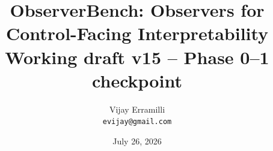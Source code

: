 \documentclass[10pt]{article}
\title{ObserverBench: Observers for Control-Facing Interpretability\\[0.25em]
\large Working draft v15 -- Phase 0--1 checkpoint}
\author{Vijay Erramilli\\\texttt{evijay@gmail.com}}
\date{July 26, 2026}
\begin{document}
\maketitle

\begin{abstract}

\end{abstract}












\end{document}
